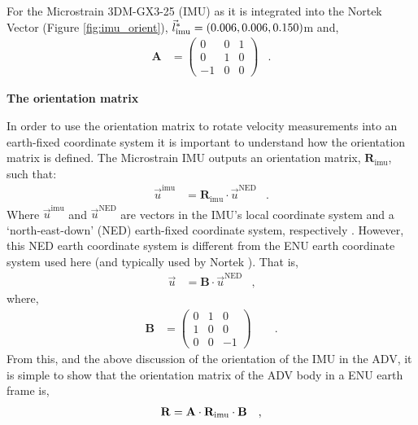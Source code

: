 \documentclass[twocol]{ametsoc}
\begin{document}
For the Microstrain 3DM-GX3-25 (IMU) as it is integrated into the Nortek Vector (Figure \ref{fig:imu_orient}), $\vec{l}^*_\mathrm{imu} = (0.006, 0.006, 0.150)$m and,
\begin{align*}
  \mathbf{A} &=
  \left (
    \begin{array}{ccc}
      0 & 0 & 1 \\
      0 & 1 & 0 \\
      -1 & 0 & 0
    \end{array}
  \right ) & .
\end{align*}


{\bf The orientation matrix}
\def\omatr{\ensuremath{\mathrm{\mathbf{R_\mathrm{imu}}}}}

In order to use the orientation matrix to rotate velocity measurements into an earth-fixed coordinate system it is important to understand how the orientation matrix is defined. The Microstrain IMU outputs an orientation matrix, \omatr, such that:
\begin{align*}
  \vec{u}^\mathrm{imu} & = \omatr \cdot \vec{u}^\mathrm{NED} & .
\end{align*}
Where $\vec{u}^\mathrm{imu}$ and $\vec{u}^\mathrm{NED}$ are vectors in the IMU's local coordinate system and a `north-east-down' (NED) earth-fixed coordinate system, respectively \cite[]{Microstrain2012a}.  
However, this NED earth coordinate system is different from the ENU earth coordinate system used here (and typically used by Nortek \cite[]{nortek_sys_int_manual2011}).  That is,
\begin{align*}
  \vec{u} &= \mathbf{B} \cdot \vec{u}^\mathrm{NED} & ,
\end{align*}
where,
\begin{align*}
  \mathbf{B} & = 
  \left (
    \begin{array}{ccc}
      0 & 1 & 0 \\
      1 & 0 & 0 \\
      0 & 0 & -1
    \end{array}
  \right ) \qquad .
\end{align*}
From this, and the above discussion of the orientation of the IMU in the ADV, it is simple to show that the orientation matrix of the ADV body in a ENU earth frame is,
\begin{align*}
  \omat &= \mathbf{A} \cdot \omatr \cdot \mathbf{B} & ,
\end{align*}





\end{document}

